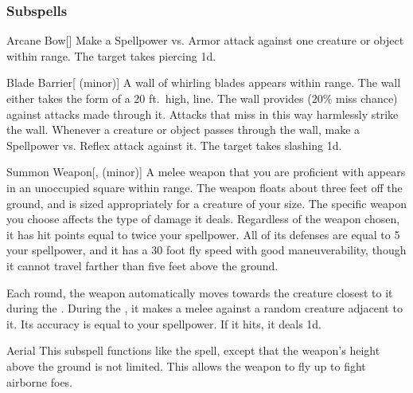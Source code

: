 \subsubsection{Subspells}


\begin{ability}[\nth{1}]{Arcane Bow}[]
Make a Spellpower vs. Armor attack against one creature or object within \rngmed range.
\hit The target takes piercing  \plus1d.
\end{ability}
\vspace{0.25em}


\begin{ability}[\nth{1}]{Blade Barrier}[ (minor)]
A wall of whirling blades appears within \rngmed range.
The wall either takes the form of a 20 ft.\ high, \arealarge line.
The wall provides  (20\% miss chance) against attacks made through it.
Attacks that miss in this way harmlessly strike the wall.
Whenever a creature or object passes through the wall, make a Spellpower vs. Reflex attack against it.
\hit The target takes slashing  \minus1d.
\end{ability}
\vspace{0.25em}


\begin{ability}[\nth{1}]{Summon Weapon}[,  (minor)]
A melee weapon that you are proficient with appears in an unoccupied square within \rngmed range.
The weapon floats about three feet off the ground, and is sized appropriately for a creature of your size.
The specific weapon you choose affects the type of damage it deals.
Regardless of the weapon chosen, it has hit points equal to twice your spellpower.
All of its defenses are equal to 5 \add your spellpower, and it has a 30 foot fly speed with good maneuverability, though it cannot travel farther than five feet above the ground.

Each round, the weapon automatically moves towards the creature closest to it during the .
During the , it makes a melee  against a random creature adjacent to it.
Its accuracy is equal to your spellpower.
If it hits, it deals  \minus1d.
\end{ability}
\vspace{0.25em}


\begin{ability}[\nth{2}]{Aerial}
This subspell functions like the  spell, except that the weapon's height above the ground is not limited.
This allows the weapon to fly up to fight airborne foes.
\end{ability}
\vspace{0.25em}


